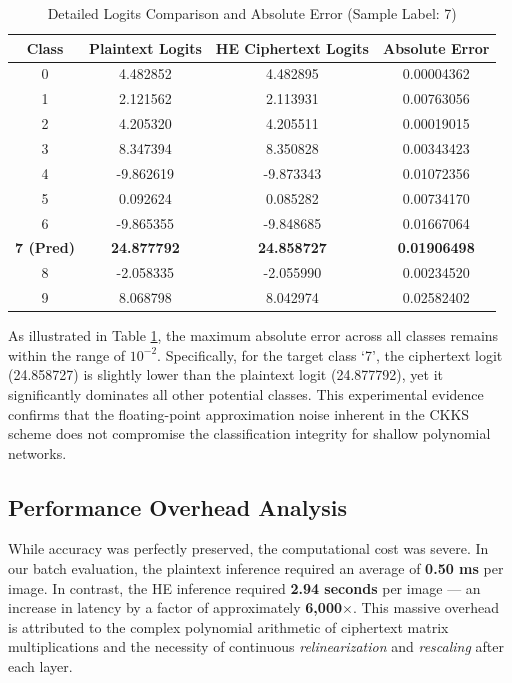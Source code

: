 \documentclass[runningheads]{llncs}
\begin{document}
\begin{table}[ht]
\centering
\caption{Detailed Logits Comparison and Absolute Error (Sample Label: 7)}
\label{tab:error}
\begin{tabular}{@{}cccc@{}}
\toprule
\textbf{Class} & \textbf{Plaintext Logits} & \textbf{HE Ciphertext Logits} & \textbf{Absolute Error} \\ \midrule
0              & 4.482852                  & 4.482895                      & 0.00004362              \\
1              & 2.121562                  & 2.113931                      & 0.00763056              \\
2              & 4.205320                  & 4.205511                      & 0.00019015              \\
3              & 8.347394                  & 8.350828                      & 0.00343423              \\
4              & -9.862619                 & -9.873343                     & 0.01072356              \\
5              & 0.092624                  & 0.085282                      & 0.00734170              \\
6              & -9.865355                 & -9.848685                     & 0.01667064              \\
\textbf{7 (Pred)} & \textbf{24.877792}     & \textbf{24.858727}            & \textbf{0.01906498}     \\ 
8              & -2.058335                 & -2.055990                     & 0.00234520              \\
9              & 8.068798                  & 8.042974                      & 0.02582402              \\ \bottomrule
\end{tabular}
\end{table}

As illustrated in Table \ref{tab:error}, the maximum absolute error across all classes remains within the range of $10^{-2}$. Specifically, for the target class `7', the ciphertext logit (24.858727) is slightly lower than the plaintext logit (24.877792), yet it significantly dominates all other potential classes. This experimental evidence confirms that the floating-point approximation noise inherent in the CKKS scheme does not compromise the classification integrity for shallow polynomial networks.

\subsection{Performance Overhead Analysis}
While accuracy was perfectly preserved, the computational cost was severe. In our batch evaluation, the plaintext inference required an average of \textbf{0.50 ms} per image. In contrast, the HE inference required \textbf{2.94 seconds} per image --- an increase in latency by a factor of approximately \textbf{6,000$\times$}. This massive overhead is attributed to the complex polynomial arithmetic of ciphertext matrix multiplications and the necessity of continuous \textit{relinearization} and \textit{rescaling} after each layer.
\end{document}
